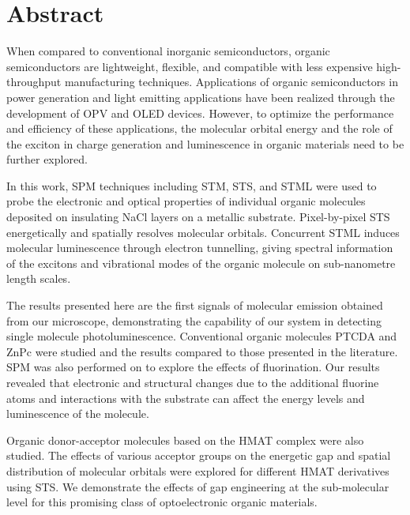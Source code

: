 


\chapter{Abstract}


When compared to conventional inorganic semiconductors, organic semiconductors are lightweight, flexible, and compatible with less expensive high-throughput manufacturing techniques. Applications of organic semiconductors in power generation and light emitting applications have been realized through the development of \ac{OPV} and \ac{OLED} devices. However, to optimize the performance and efficiency of these applications, the molecular orbital energy and the role of the exciton in charge generation and luminescence in organic materials need to be further explored.

In this work, \ac{SPM} techniques including \ac{STM}, \ac{STS}, and \ac{STML} were used to probe the electronic and optical properties of individual organic molecules deposited on insulating NaCl layers on a metallic substrate. Pixel-by-pixel \ac{STS} energetically and spatially resolves molecular orbitals. Concurrent \ac{STML} induces molecular luminescence through electron tunnelling, giving spectral information of the excitons and vibrational modes of the organic molecule on sub-nanometre length scales.

\sloppy The results presented here are the first signals of molecular emission obtained from our microscope, demonstrating the capability of our system in detecting single molecule photoluminescence.  Conventional organic molecules \ac{PTCDA} and \ac{ZnPc} were studied and the results compared to those presented in the literature. \ac{SPM} was also performed on  to explore the effects of fluorination. Our results revealed that electronic and structural changes due to the additional fluorine atoms and interactions with the substrate can affect the energy levels and luminescence of the molecule.

\sloppy Organic donor-acceptor molecules based on the \ac{HMAT} complex were also studied. The effects of various acceptor groups on the energetic gap and spatial distribution of molecular orbitals were explored for different \ac{HMAT} derivatives using \ac{STS}. We demonstrate the effects of gap engineering at the sub-molecular level for this promising class of optoelectronic organic materials.










\vfill
\begin{center}
\begin{sf}
\end{sf}
\end{center}
